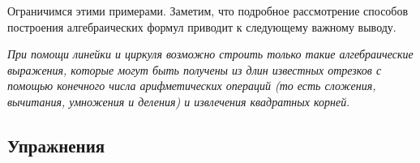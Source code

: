 \documentclass[twoside]{book}
\begin{document}
Ограничимся этими примерами.
Заметим, что подробное рассмотрение способов построения алгебраических формул приводит к следующему важному выводу.

\emph{При помощи линейки и циркуля возможно строить только такие алгебраические выражения, которые могут быть получены из длин известных отрезков с помощью конечного числа арифметических операций \emph{(то есть сложения, вычитания, умножения и деления)} 
и извлечения квадратных корней}.

\subsection*{Упражнения}

\begin{center}
\end{center}
\end{document}
